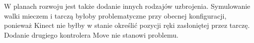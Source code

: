 W planach rozwoju jest także dodanie innych rodzajów uzbrojenia. 
Symulowanie walki mieczem i tarczą byłoby problematyczne przy obecnej konfiguracji, 
ponieważ Kinect nie byłby w stanie określić pozycji ręki zasłoniętej przez tarczę. 
Dodanie drugiego kontrolera Move nie stanowi problemu.

